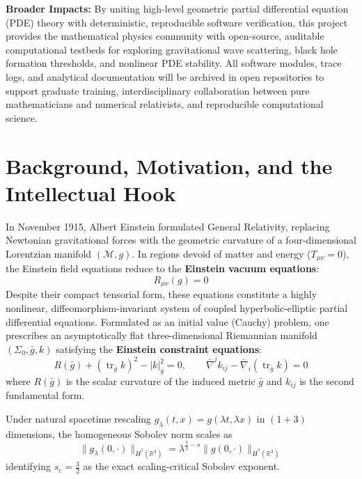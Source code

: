 \documentclass[11pt, a4paper]{article}
\begin{document}
\vspace{0.4em}
\noindent \textbf{Broader Impacts:} By uniting high-level geometric partial differential equation (PDE) theory with deterministic, reproducible software verification, this project provides the mathematical physics community with open-source, auditable computational testbeds for exploring gravitational wave scattering, black hole formation thresholds, and nonlinear PDE stability. All software modules, trace logs, and analytical documentation will be archived in open repositories to support graduate training, interdisciplinary collaboration between pure mathematicians and numerical relativists, and reproducible computational science.

\section{Background, Motivation, and the Intellectual Hook}

In November 1915, Albert Einstein formulated General Relativity, replacing Newtonian gravitational forces with the geometric curvature of a four-dimensional Lorentzian manifold $(\mathcal{M}, g)$. In regions devoid of matter and energy ($T_{\mu\nu} = 0$), the Einstein field equations reduce to the \textbf{Einstein vacuum equations}:
\begin{equation}
    R_{\mu\nu}(g) = 0
\end{equation}
Despite their compact tensorial form, these equations constitute a highly nonlinear, diffeomorphism-invariant system of coupled hyperbolic-elliptic partial differential equations. Formulated as an initial value (Cauchy) problem, one prescribes an asymptotically flat three-dimensional Riemannian manifold $(\Sigma_0, \bar{g}, k)$ satisfying the \textbf{Einstein constraint equations}:
\begin{equation}
    R(\bar{g}) + (\operatorname{tr}_{\bar{g}} k)^2 - |k|_{\bar{g}}^2 = 0, \qquad \bar{\nabla}^j k_{ij} - \bar{\nabla}_i (\operatorname{tr}_{\bar{g}} k) = 0
\end{equation}
where $R(\bar{g})$ is the scalar curvature of the induced metric $\bar{g}$ and $k_{ij}$ is the second fundamental form.

Under natural spacetime rescaling $g_\lambda(t,x) = g(\lambda t, \lambda x)$ in $(1+3)$ dimensions, the homogeneous Sobolev norm scales as
\begin{equation}
    \|g_\lambda(0,\cdot)\|_{\dot{H}^s(\mathbb{R}^3)} = \lambda^{\frac{3}{2} - s} \|g(0,\cdot)\|_{\dot{H}^s(\mathbb{R}^3)}
\end{equation}
identifying $s_c = \frac{3}{2}$ as the exact scaling-critical Sobolev exponent.
\end{document}
